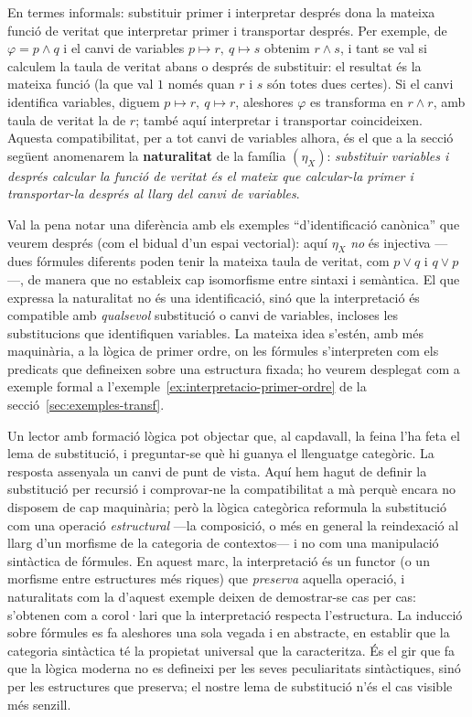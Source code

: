 En termes informals: substituir primer i interpretar després dona la mateixa funció de veritat que interpretar primer i transportar després. Per exemple, de $\varphi=p\land q$ i el canvi de variables $p\mapsto r,\ q\mapsto s$ obtenim $r\land s$, i tant se val si calculem la taula de veritat abans o després de substituir: el resultat és la mateixa funció (la que val $1$ només quan $r$ i $s$ són totes dues certes). Si el canvi identifica variables, diguem $p\mapsto r,\ q\mapsto r$, aleshores $\varphi$ es transforma en $r\land r$, amb taula de veritat la de $r$; també aquí interpretar i transportar coincideixen. Aquesta compatibilitat, per a tot canvi de variables alhora, és el que a la secció següent anomenarem la \textbf{naturalitat} de la família $(\eta_X)$: \emph{substituir variables i després calcular la funció de veritat és el mateix que calcular-la primer i transportar-la després al llarg del canvi de variables}.

Val la pena notar una diferència amb els exemples \enquote{d'identificació canònica} que veurem després (com el bidual d'un espai vectorial): aquí $\eta_X$ \emph{no} és injectiva ---dues fórmules diferents poden tenir la mateixa taula de veritat, com $p\lor q$ i $q\lor p$---, de manera que no estableix cap isomorfisme entre sintaxi i semàntica. El que expressa la naturalitat no és una identificació, sinó que la interpretació és compatible amb \emph{qualsevol} substitució o canvi de variables, incloses les substitucions que identifiquen variables. La mateixa idea s'estén, amb més maquinària, a la lògica de primer ordre, on les fórmules s'interpreten com els predicats que defineixen sobre una estructura fixada; ho veurem desplegat com a exemple formal a l'exemple~\ref{ex:interpretacio-primer-ordre} de la secció~\ref{sec:exemples-transf}.

\begin{observacio}
Un lector amb formació lògica pot objectar que, al capdavall, la feina l'ha feta el lema de substitució, i preguntar-se què hi guanya el llenguatge categòric. La resposta assenyala un canvi de punt de vista. Aquí hem hagut de definir la substitució per recursió i comprovar-ne la compatibilitat a mà perquè encara no disposem de cap maquinària; però la lògica categòrica reformula la substitució com una operació \emph{estructural} ---la composició, o més en general la reindexació al llarg d'un morfisme de la categoria de contextos--- i no com una manipulació sintàctica de fórmules. En aquest marc, la interpretació és un functor (o un morfisme entre estructures més riques) que \emph{preserva} aquella operació, i naturalitats com la d'aquest exemple deixen de demostrar-se cas per cas: s'obtenen com a corol·lari que la interpretació respecta l'estructura. La inducció sobre fórmules es fa aleshores una sola vegada i en abstracte, en establir que la categoria sintàctica té la propietat universal que la caracteritza. És el gir que fa que la lògica moderna no es defineixi per les seves peculiaritats sintàctiques, sinó per les estructures que preserva; el nostre lema de substitució n'és el cas visible més senzill.
\end{observacio}

